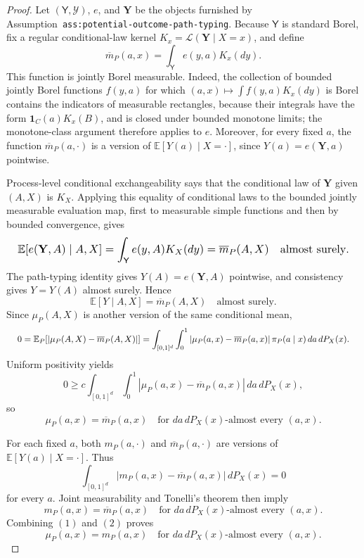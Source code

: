 \documentclass{article}
\begin{document}
\begin{proof}
Let \((\mathsf Y,\mathcal Y)\), \(e\), and \(\mathbf Y\) be the objects furnished by Assumption~\texttt{ass:potential-outcome-path-typing}. Because \(\mathsf Y\) is standard Borel, fix a regular conditional-law kernel \(K_x=\mathcal L(\mathbf Y\mid X=x)\), and define
\[
\overline m_P(a,x)=\int_{\mathsf Y}e(y,a)K_x(dy).
\]
This function is jointly Borel measurable. Indeed, the collection of bounded jointly Borel functions \(f(y,a)\) for which \((a,x)\mapsto\int f(y,a)K_x(dy)\) is Borel contains the indicators of measurable rectangles, because their integrals have the form \(\mathbf 1_C(a)K_x(B)\), and is closed under bounded monotone limits; the monotone-class argument therefore applies to \(e\). Moreover, for every fixed \(a\), the function \(\overline m_P(a,\cdot)\) is a version of \(\mathbb E[Y(a)\mid X=\cdot]\), since \(Y(a)=e(\mathbf Y,a)\) pointwise.

Process-level conditional exchangeability says that the conditional law of \(\mathbf Y\) given \((A,X)\) is \(K_X\). Applying this equality of conditional laws to the bounded jointly measurable evaluation map, first to measurable simple functions and then by bounded convergence, gives
\[
\makebox[\linewidth][c]{\resizebox{0.98\linewidth}{!}{\(\displaystyle \mathbb E[e(\mathbf Y,A)\mid A,X]
=
\int_{\mathsf Y}e(y,A)K_X(dy)
=
\overline m_P(A,X)
\quad\text{almost surely}.\)}}
\]
The path-typing identity gives \(Y(A)=e(\mathbf Y,A)\) pointwise, and consistency gives \(Y=Y(A)\) almost surely. Hence
\[
\mathbb E[Y\mid A,X]=\overline m_P(A,X)
\quad\text{almost surely}.
\]
Since \(\mu_P(A,X)\) is another version of the same conditional mean,
\[
\makebox[\linewidth][c]{\resizebox{0.98\linewidth}{!}{\(\displaystyle 0
=
\mathbb E_P\!\left[\left|\mu_P(A,X)-\overline m_P(A,X)\right|\right]
=
\int_{[0,1]^d}\int_0^1
\left|\mu_P(a,x)-\overline m_P(a,x)\right|\pi_P(a\mid x)\,da\,dP_X(x).\)}}
\]
Uniform positivity yields
\[
0
\ge
c\int_{[0,1]^d}\int_0^1
\left|\mu_P(a,x)-\overline m_P(a,x)\right|\,da\,dP_X(x),
\]
so
\[
\mu_P(a,x)=\overline m_P(a,x)
\quad\text{for }da\,dP_X(x)\text{-almost every }(a,x). \tag{1}
\]

For each fixed \(a\), both \(m_P(a,\cdot)\) and \(\overline m_P(a,\cdot)\) are versions of \(\mathbb E[Y(a)\mid X=\cdot]\). Thus
\[
\int_{[0,1]^d}\left|m_P(a,x)-\overline m_P(a,x)\right|\,dP_X(x)=0
\]
for every \(a\). Joint measurability and Tonelli's theorem then imply
\[
m_P(a,x)=\overline m_P(a,x)
\quad\text{for }da\,dP_X(x)\text{-almost every }(a,x). \tag{2}
\]
Combining \((1)\) and \((2)\) proves
\[
\mu_P(a,x)=m_P(a,x)
\quad\text{for }da\,dP_X(x)\text{-almost every }(a,x).
\]


\end{proof}
\end{document}
